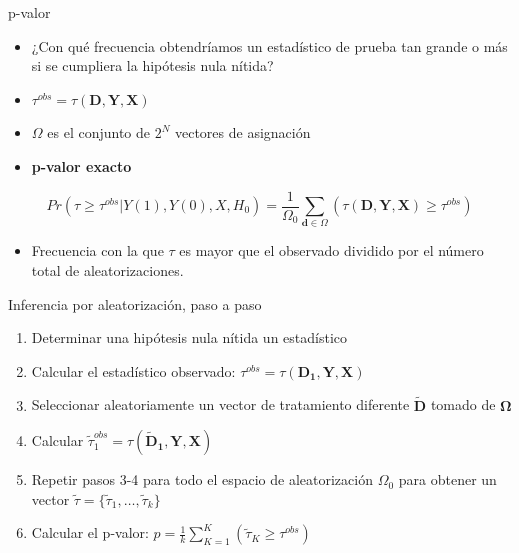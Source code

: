\documentclass[
  ignorenonframetext,
]{beamer}
\providecommand{\tightlist}{%
  \setlength{\itemsep}{0pt}\setlength{\parskip}{0pt}}
\begin{document}
\begin{frame}{p-valor}
\protect\hypertarget{p-valor}{}
\begin{itemize}
\item
  ¿Con qué frecuencia obtendríamos un estadístico de prueba tan grande o
  más si se cumpliera la hipótesis nula nítida?
\item
  \(\tau^{obs} = \tau (\mathbf{D},\mathbf{Y},\mathbf{X})\)
\item
  \(\Omega\) es el conjunto de \(2^N\) vectores de asignación
\end{itemize}

\pause

\begin{itemize}
\tightlist
\item
  \textbf{p-valor exacto}
\end{itemize}

\[Pr(\tau \geq \tau^{obs} | Y(1), Y(0), X, H_0) = \frac{1}{\Omega_0} \sum_{\mathbf{d} \in \Omega} (\tau (\mathbf{D},\mathbf{Y},\mathbf{X}) \ge \tau^{obs})\]

\pause

\begin{itemize}
\tightlist
\item
  Frecuencia con la que \(\tau\) es mayor que el observado dividido por
  el número total de aleatorizaciones.
\end{itemize}
\end{frame}

\begin{frame}{Inferencia por aleatorización, paso a paso}
\protect\hypertarget{inferencia-por-aleatorizaciuxf3n-paso-a-paso}{}
\begin{enumerate}
\tightlist
\item
  Determinar una hipótesis nula nítida un estadístico \pause
\item
  Calcular el estadístico observado:
  \(\tau^{obs} = \tau (\mathbf{D_1},\mathbf{Y},\mathbf{X})\) \pause
\item
  Seleccionar aleatoriamente un vector de tratamiento diferente
  \(\mathbf{\tilde{D}}\) tomado de \(\mathbf{\Omega}\) \pause
\item
  Calcular
  \(\tilde{\tau}_{1}^{obs} = \tau (\mathbf{\tilde{D}_1},\mathbf{Y},\mathbf{X})\)
  \pause
\item
  Repetir pasos 3-4 para todo el espacio de aleatorización \(\Omega_0\)
  para obtener un vector
  \(\tilde{\tau} = \{\tilde{\tau}_1, \dots, \tilde{\tau}_k\}\) \pause
\item
  Calcular el p-valor:
  \(p= \frac{1}{k}\sum_{K=1}^{K}(\tilde{\tau}_K \geq \tau^{obs})\)
\end{enumerate}
\end{frame}
\end{document}
